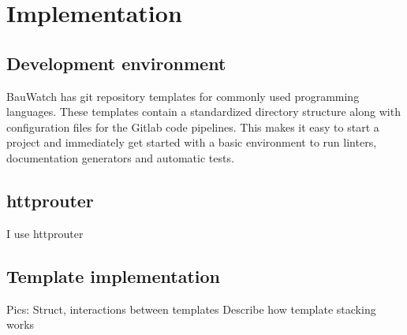 \chapter{Implementation}
\section{Development environment}
BauWatch has git repository templates for commonly used programming languages. These templates contain a standardized directory structure along with configuration
files for the Gitlab code pipelines. This makes it easy to start a project and immediately get started with a basic environment to run linters, documentation
generators and automatic tests.

\section{httprouter}
I use httprouter


\section{Template implementation}
Pics:
Struct, interactions between templates
Describe how template stacking works
